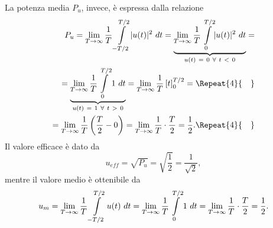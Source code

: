 \documentclass[12pt,oneside,openany]{memoir}
\numberwithin{equation}{subsection}
\DeclarePairedDelimiter{\abs}{\lvert}{\rvert}
\newcommand{\quads}[1]{\Repeat{#1}{\quad}}
\newcommand{\dt}{\ dt}
\begin{document}
La potenza media $P_u$, invece, \`e espressa dalla relazione
\begin{equation}
	\begin{split}
		P_u = \lim_{T \rightarrow \infty} \frac{1}{T} \int\displaylimits_{-T/2}^{T/2} \abs{u(t)}^2 \dt = \underbrace{\lim_{T \rightarrow \infty} \frac{1}{T} \int\displaylimits_{0}^{T/2} \abs{u(t)}^2 \dt}_{u(t) \ = \ 0 \ \forall \ t \ < \ 0} =
		\\
		= \underbrace{\lim_{T \rightarrow \infty} \frac{1}{T} \int\displaylimits_{0}^{T/2} 1 \dt}_{u(t) \ = \ 1 \ \forall \ t \ > \ 0} = \lim_{T \rightarrow \infty} \frac{1}{T} \left[ t \right]_0^{T/2} =
		\quads{4}
		\\
		= \lim_{T \rightarrow \infty} \frac{1}{T} \left(\frac{T}{2} - 0\right) = \lim_{T \rightarrow \infty} \frac{1}{T} \cdot \frac{T}{2} = \frac{1}{2}.
		\quads{4}
	\end{split}
\end{equation}
Il valore efficace \`e dato da
\begin{equation}
	u_{eff} = \sqrt{P_u} = \sqrt{\frac{1}{2}} = \frac{1}{\sqrt{2}},
\end{equation}
mentre il valore medio \`e ottenibile da
\begin{equation}
	\begin{split}
		u_m = \lim_{T \rightarrow \infty} \frac{1}{T} \int\displaylimits_{-T/2}^{T/2} u(t) \dt = \lim_{T \rightarrow \infty} \frac{1}{T} \int\displaylimits_{0}^{T/2} 1 \dt = \lim_{T \rightarrow \infty} \frac{1}{T} \cdot \frac{T}{2} = \frac{1}{2}.
	\end{split}
\end{equation}
\end{document}
